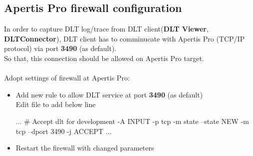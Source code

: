 \subsection{Apertis Pro firewall configuration}
In order to capture DLT log/trace from DLT client(\textbf{DLT Viewer}, 
\textbf{DLTConnector}), DLT client has to comminucate with Apertis Pro  
(TCP/IP protocol) via port \textbf{3490} (as default).\\
So that, this connection should be allowed on Apertis Pro target.\\
\\
Adopt settings of firewall at Apertis Pro:
\begin{itemize}
   \item Add new rule to allow DLT service at port \textbf{3490} (as default)\\
   Edit  file to add below line
   \begin{robotlisting}
...
# Accept dlt for development
-A INPUT -p tcp -m state --state NEW -m tcp --dport 3490 -j ACCEPT
...
   \end{robotlisting}

   \item Restart the firewall with changed parameters\\
\end{itemize}

